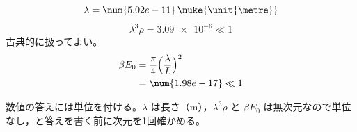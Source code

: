 \[ \lambda=\num{5.02e-11}\,\nuke{\unit{\metre}} \]
\[ \lambda^{3}\rho=\num{3.09e-6}\ll1 \]
古典的に扱ってよい。
\begin{align*}
\beta E_0&=\frac{\pi}{4}\Bigl(\frac{\lambda}{L}\Bigr)^{2}\\
&=\num{1.98e-17}\ll1
\end{align*}
\item 数値の答えには単位を付ける。$\lambda$ は長さ（$\unit{\metre}$），$\lambda^{3}\rho$ と $\beta E_0$ は無次元なので単位なし，と答えを書く前に次元を1回確かめる。
